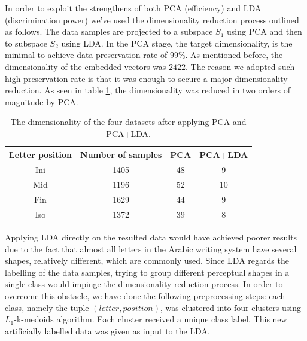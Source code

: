\iftoggle{edit-mode}{\hspace{0pt}\marginpar{Implementation: PCA}}{}
In order to exploit the strengthens of both PCA (efficiency) and LDA (discrimination power) we've used the dimensionality reduction process outlined as follows. 
The data samples are projected to a subspace $S_1$ using PCA and then to subspace $S_2$ using LDA. 
In the PCA stage, the target dimensionality, is the minimal to achieve data preservation rate of 99\%. 
As mentioned before, the dimensionality of the embedded vectors was $2422$. 
The reason we adopted such high preservation rate is that it was enough to secure a major dimensionality reduction. 
As seen in table \ref{table:dr_dimensions_results}, the dimensionality was reduced in two orders of magnitude by PCA.

\begin{table}
\centering
\caption{The dimensionality of the four datasets after applying PCA and PCA+LDA.}
\begin{tabular}{ c c c c }
\toprule
\textbf{Letter position} & \textbf{Number of samples} & \textbf{PCA} & \textbf{PCA+LDA} \\
\midrule                 
  Ini & 1405 & 48 & 9 \\ 
  Mid & 1196 & 52 & 10 \\ 
  Fin & 1629 & 44 & 9 \\ 
  Iso & 1372 & 39 & 8 \\ 
  \bottomrule
\end{tabular}
\label{table:dr_dimensions_results} 
\end{table}

\iftoggle{edit-mode}{\hspace{0pt}\marginpar{Implementation: Clustering and LDA}}{}
Applying LDA directly on the resulted data would have achieved poorer results due to the fact that almost all letters in the Arabic writing system have several shapes, relatively different, which are commonly used. 
Since LDA regards the labelling of the data samples, trying to group different perceptual shapes in a single class would impinge the dimensionality reduction process. 
In order to overcome this obstacle, we have done the following preprocessing steps: each class, namely the tuple $(letter, position)$, was clustered into four clusters using $L_1$-k-medoids algorithm. 
Each cluster received a unique class label. 
This new artificially labelled data was given as input to the LDA.

